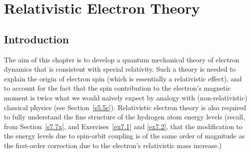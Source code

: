 \chapter{Relativistic Electron Theory}\label{c11}

\section{Introduction}
The aim of this chapter is to develop a quantum mechanical theory of electron
dynamics that is consistent with special relativity. Such a theory is needed
to explain the origin of electron spin (which is essentially a relativistic effect),
and to account for the fact that the spin contribution to the electron's magnetic
moment is twice what we would naively expect by analogy with (non-relativistic)
classical physics (see Section~\ref{s5.5c}). Relativistic electron theory is
also required to fully understand the fine structure of the hydrogen
atom energy levels (recall, from Section~\ref{s7.7x}, and Exercises~\ref{ex7.1} and \ref{ex7.2}, that the modification to the energy
levels due to spin-orbit coupling is of the same order of magnitude as the
first-order correction due to the electron's relativistic mass increase.)

